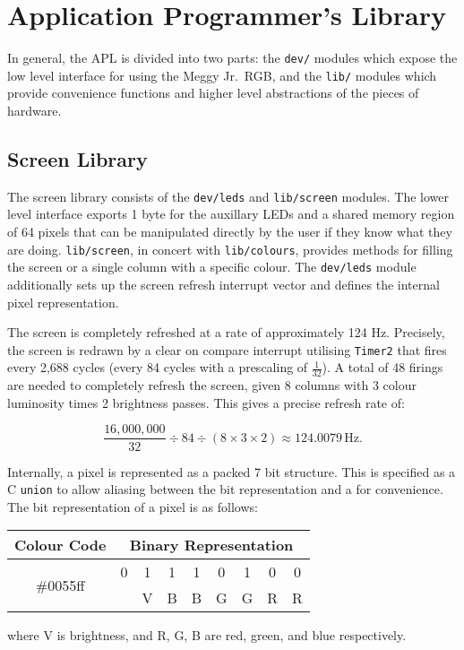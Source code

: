 \documentclass[a4paper,10pt]{article}
\newcommand\meggyjr{Meggy Jr.\ RGB}
\begin{document}
\section*{Application Programmer's Library}

In general, the APL is divided into two parts: the \texttt{dev/} modules which
expose the low level interface for using the \meggyjr, and the \texttt{lib/}
modules which provide convenience functions and higher level abstractions of
the pieces of hardware.

\subsection*{Screen Library}
\label{sub:Screen Library}

The screen library consists of the \texttt{dev/leds} and \texttt{lib/screen}
modules. The lower level interface exports 1 byte for the auxillary LEDs and a
shared memory region of 64 pixels that can be manipulated directly by the user
if they know what they are doing. \texttt{lib/screen}, in concert with
\texttt{lib/colours}, provides methods for filling the screen or a single
column with a specific colour. The \texttt{dev/leds} module additionally sets
up the screen refresh interrupt vector and defines the internal pixel
representation.

The screen is completely refreshed at a rate of approximately 124\thinspace
Hz. Precisely, the screen is redrawn by a clear on compare interrupt utilising
\texttt{Timer2} that fires every 2,688 cycles (every 84 cycles with a
prescaling of $\frac{1}{32}$). A total of 48 firings are needed to completely
refresh the screen, given 8 columns with 3 colour luminosity times 2
brightness passes.  This gives a precise refresh rate of:

\[
  \frac{16,000,000}{32} \div 84 \div (8 \times 3 \times 2) \approx
  124.0079\,\mathrm{Hz}.
\]

Internally, a pixel is represented as a packed 7 bit structure. This is
specified as a C \lstinline!union! to allow aliasing between the bit
representation and a for convenience. The bit
representation of a pixel is as follows:

\begin{center}
\begin{tabular}{ccccccccc}
\toprule
Colour Code & \multicolumn{8}{c}{Binary Representation}\tabularnewline
\midrule
 \multirow{2}{*}{\#0055ff} & 0 & 1 & 1 & 1 & 0 & 1 & 0 & 0\tabularnewline
 &  & V & B & B & G & G & R & R\tabularnewline
\bottomrule
\end{tabular}
\end{center}
where V is brightness, and R, G, B are red, green, and blue respectively.
\end{document}
